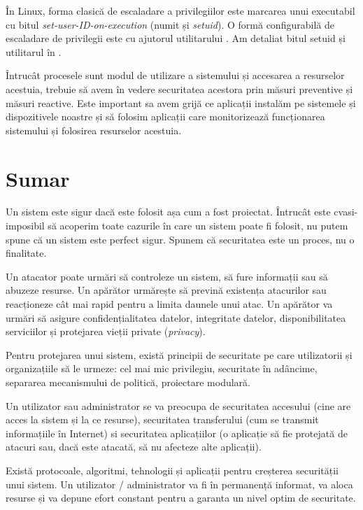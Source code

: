 În Linux, forma clasică de escaladare a privilegiilor este marcarea unui executabil cu bitul \textit{set-user-ID-on-execution} (numit și \textit{setuid}).
O formă configurabilă de escaladare de privilegii este cu ajutorul utilitarului .
Am detaliat bitul setuid și utilitarul  în .

Întrucât procesele sunt modul de utilizare a sistemului și accesarea a resurselor acestuia, trebuie să avem în vedere securitatea acestora prin măsuri preventive și măsuri reactive. Este important sa avem grijă ce aplicații instalăm pe sistemele și dispozitivele noastre și să folosim aplicații care monitorizează funcționarea sistemului și folosirea resurselor acestuia.

\section{Sumar}
\label{sec:sec:summary}

Un sistem este sigur dacă este folosit așa cum a fost proiectat.
Întrucât este cvasi-imposibil să acoperim toate cazurile în care un sistem poate fi folosit, nu putem spune că un sistem este perfect sigur.
Spunem că securitatea este un proces, nu o finalitate.

Un atacator poate urmări să controleze un sistem, să fure informații sau să abuzeze resurse.
Un apărător urmărește să prevină existența atacurilor sau reacționeze cât mai rapid pentru a limita daunele unui atac.
Un apărător va urmări să asigure confidențialitatea datelor, integritate datelor, disponibilitatea serviciilor și protejarea vieții private (\textit{privacy}).

Pentru protejarea unui sistem, există principii de securitate pe care utilizatorii și organizațiile să le urmeze: cel mai mic privilegiu, securitate în adâncime, separarea mecanismului de politică, proiectare modulară.

Un utilizator sau administrator se va preocupa de securitatea accesului (cine are acces la sistem și la ce resurse), securitatea transferului (cum se transmit informațiile în Internet) si securitatea aplicațiilor (o aplicație să fie protejată de atacuri sau, dacă este atacată, să nu afecteze alte aplicații).

Există protocoale, algoritmi, tehnologii și aplicații pentru creșterea securității unui sistem.
Un utilizator / administrator va fi în permanență informat, va aloca resurse și va depune efort constant pentru a garanta un nivel optim de securitate.
